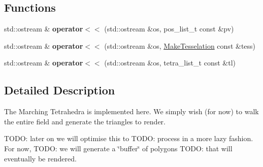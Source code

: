 \subsection*{Functions}
\begin{DoxyCompactItemize}
\item 
\mbox{\label{namespacemgs_1_1march_a34eba5cecd2d1b25d6d0f9b78e9ffc1a}} 
std\+::ostream \& {\bfseries operator$<$$<$} (std\+::ostream \&os, pos\+\_\+list\+\_\+t const \&pv)
\item 
\mbox{\label{namespacemgs_1_1march_abff648da6f597f80e9d27b67d5e006d6}} 
std\+::ostream \& {\bfseries operator$<$$<$} (std\+::ostream \&os, \hyperlink{classmgs_1_1march_1_1MakeTesselation}{Make\+Tesselation} const \&tess)
\item 
\mbox{\label{namespacemgs_1_1march_aea64facfbf2654abafd500e598eb66e1}} 
std\+::ostream \& {\bfseries operator$<$$<$} (std\+::ostream \&os, tetra\+\_\+list\+\_\+t const \&tl)
\end{DoxyCompactItemize}


\subsection{Detailed Description}
The Marching Tetrahedra is implemented here. We simply wish (for now) to walk the entire field and generate the triangles to render.

T\+O\+DO\+: later on we will optimise this to T\+O\+DO\+: process in a more lazy fashion. For now, T\+O\+DO\+: we will generate a \char`\"{}buffer\char`\"{} of polygons T\+O\+DO\+: that will eventually be rendered. 